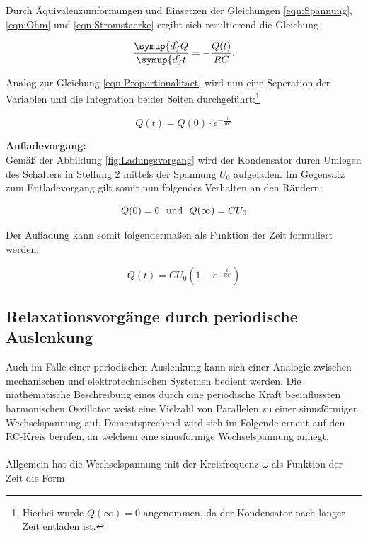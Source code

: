 \noindent Durch Äquivalenzumformungen und Einsetzen der Gleichungen \eqref{eqn:Spannung}, \eqref{eqn:Ohm} und \eqref{eqn:Stromstaerke} ergibt sich 
resultierend die Gleichung

\begin{equation}
    \frac{\symup{d}Q}{\symup{d}t} = -\frac{Q(t)}{RC}.
\end{equation}

\noindent Analog zur Gleichung \eqref{eqn:Proportionalitaet} wird nun eine Seperation der Variablen und die Integration beider
Seiten durchgeführt:\footnote{Hierbei wurde $Q(\infty) = 0$ angenommen, da der Kondensator nach langer Zeit
entladen ist.}

\begin{equation}
\label{eqn:}
    Q(t) = Q(0) \cdot e^{-\frac{t}{RC}}
\end{equation}

\noindent \textbf{Aufladevorgang:}\\
Gemäß der Abbildung \ref{fig:Ladungsvorgang} wird der Kondensator durch Umlegen des Schalters in Stellung 2 mittels der Spannung
$U_0$ aufgeladen. Im Gegensatz zum Entladevorgang gilt somit nun folgendes Verhalten an den Rändern:

\begin{equation*}
    Q(0) =0 \,\,\,\,\text{und}\,\,\,\, Q(\infty)= CU_0\\
\end{equation*}

\noindent Der Aufladung kann somit folgendermaßen als Funktion der Zeit formuliert werden:

\begin{equation}
    Q(t) = CU_0\left(1 - e^{-\frac{t}{RC}}\right)
\end{equation}

\subsection{Relaxationsvorgänge durch periodische Auslenkung}

Auch im Falle einer periodischen Auslenkung kann sich einer Analogie zwischen mechanischen und elektrotechnischen Systemen
bedient werden. Die mathematische Beschreibung eines durch eine periodische Kraft beeinflussten harmonischen Oszillator weist
eine Vielzahl von Parallelen zu einer sinusförmigen Wechselspannung auf. Dementsprechend wird sich im Folgende erneut auf den
RC-Kreis berufen, an welchem eine sinusförmige Wechselspannung anliegt.\\\\
Allgemein hat die Wechselspannung mit der Kreisfrequenz $\omega$ als Funktion der Zeit die Form


